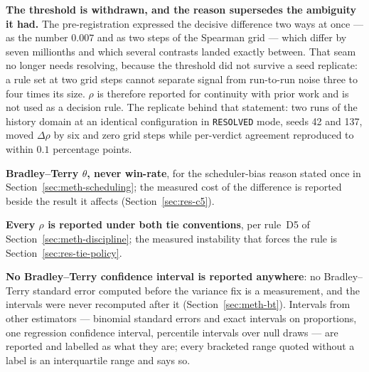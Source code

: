 
\textbf{The threshold is withdrawn, and the reason supersedes the
ambiguity it had.} The pre-registration expressed the decisive difference
two ways at once --- as the number $0.007$ and as two steps of the
Spearman grid --- which differ by seven millionths and which several
contrasts landed exactly between. That seam no longer needs resolving,
because the threshold did not survive a seed replicate: a rule set at
two grid steps cannot
separate signal from run-to-run noise three to four times its size.
$\rho$ is therefore reported for continuity with prior work and is not
used as a decision rule.
The replicate behind that statement: two runs of the history domain at
an identical configuration in \texttt{RESOLVED} mode, seeds 42 and 137,
moved $\Delta\rho$ by six and zero grid steps while per-verdict
agreement reproduced to within $0.1$ percentage points.

\textbf{Bradley--Terry $\theta$, never win-rate}, for the
scheduler-bias reason stated once in
Section~\ref{sec:meth-scheduling}; the measured cost of the difference
is reported beside the result it affects
(Section~\ref{sec:res-c5}).

\textbf{Every $\rho$ is reported under both tie conventions}, per
rule~D5 of Section~\ref{sec:meth-discipline}; the measured instability
that forces the rule is Section~\ref{sec:res-tie-policy}.

\textbf{No Bradley--Terry confidence interval is reported anywhere}:
no Bradley--Terry standard error computed before the variance fix is
a measurement, and the intervals were never recomputed after it
(Section~\ref{sec:meth-bt}). Intervals from other estimators ---
binomial standard errors and exact intervals on proportions, one
regression confidence interval, percentile intervals over null draws
--- are reported and labelled as what they are; every bracketed range
quoted without a label is an interquartile range and says so.


